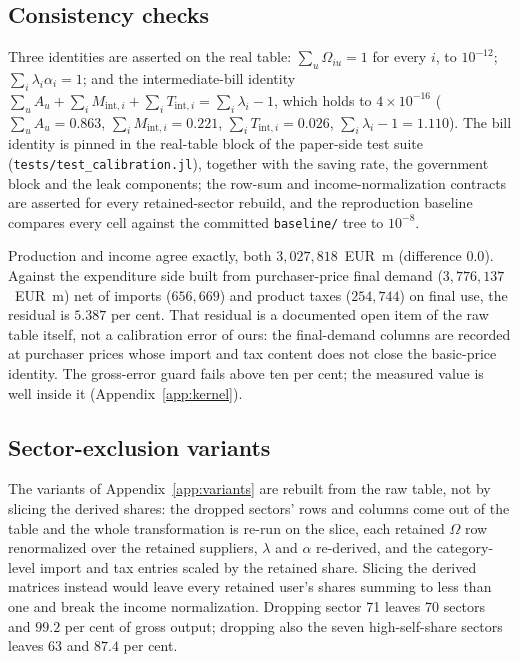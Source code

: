\subsection{Consistency checks}\label{app:pipeline-checks}

Three identities are asserted on the real table:
$\sum_u\Omega_{iu}=1$ for every $i$, to $10^{-12}$;
$\sum_i\lambda_i\alpha_i=1$; and the intermediate-bill identity
$\sum_u A_u+\sum_i M_{\mathrm{int},i}+\sum_i T_{\mathrm{int},i}=\sum_i\lambda_i-1$,
which holds to $4\times10^{-16}$ ($\sum_uA_u=0.863$,
$\sum_iM_{\mathrm{int},i}=0.221$, $\sum_iT_{\mathrm{int},i}=0.026$,
$\sum_i\lambda_i-1=1.110$). The bill identity is pinned in the real-table block
of the paper-side test suite (\texttt{tests/test\_calibration.jl}), together with
the saving rate, the government block and the leak components; the row-sum and
income-normalization contracts are asserted for every retained-sector rebuild,
and the reproduction baseline compares every cell against the committed
\texttt{baseline/} tree to $10^{-8}$.

Production and income agree exactly, both $3{,}027{,}818$~EUR~m (difference
$0.0$). Against the expenditure side built from purchaser-price final demand
($3{,}776{,}137$~EUR~m) net of imports ($656{,}669$) and product taxes
($254{,}744$) on final use, the residual is $5.387$ per cent. That residual is a
documented open item of the raw table itself, not a calibration error of ours:
the final-demand columns are recorded at purchaser prices whose import and tax
content does not close the basic-price identity. The gross-error guard fails
above ten per cent; the measured value is well inside it
(Appendix~\ref{app:kernel}).

\subsection{Sector-exclusion variants}\label{app:pipeline-variants}

The variants of Appendix~\ref{app:variants} are rebuilt from the raw table, not
by slicing the derived shares: the dropped sectors' rows and columns come out of
the table and the whole transformation is re-run on the slice, each retained
$\Omega$ row renormalized over the retained suppliers, $\lambda$ and $\alpha$
re-derived, and the category-level import and tax entries scaled by the retained
share. Slicing the derived matrices instead would leave every
retained user's shares summing to less than one and break the income
normalization. Dropping sector 71 leaves 70 sectors and $99.2$ per cent of gross
output; dropping also the seven high-self-share sectors leaves 63 and $87.4$ per
cent.
